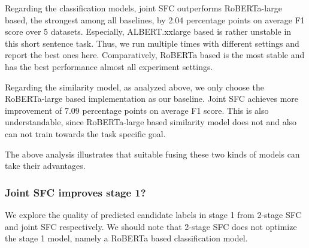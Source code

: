\begin{table}
  \begin{centering}
  \end{centering}
  \caption{
    The performances of SFC from different settings of hyperparameters, $K$ denoting the candidate class number from stage 1,
    $P$ denoting the number of sampled sentence pair in stage 2. 
  }
  \label{tbe:table3}
\end{table}

Regarding the classification models, joint SFC outperforms RoBERTa-large based, the strongest among all baselines, by 2.04 percentage points on average F1 score over 5 datasets. 
Especially, ALBERT.xxlarge based is rather unstable in this short sentence task. 
Thus, we run multiple times with different settings and report the best ones here. 
Comparatively, RoBERTa based is the most stable and has the best performance almost all experiment settings.

Regarding the similarity model, as analyzed above, we only choose the RoBERTa-large based implementation as our baseline. 
Joint SFC achieves more improvement of 7.09 percentage points on average F1 score. 
This is also understandable, since RoBERTa-large based similarity model does not and also can not train towards the task specific goal.

The above analysis illustrates that suitable fusing these two kinds of models can take their advantages.

\subsubsection*{Joint SFC improves stage 1?}
We explore the quality of predicted candidate labels in stage 1 from 2-stage SFC and joint SFC respectively. 
We should note that 2-stage SFC does not optimize the stage 1 model, namely a RoBERTa based classification model.

